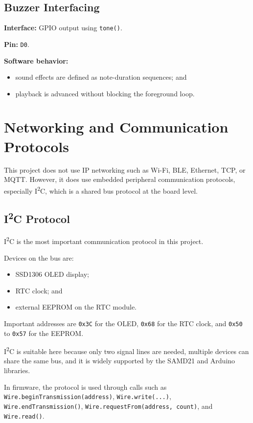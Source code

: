 \documentclass[conference]{IEEEtran}
\begin{document}
\subsection{Buzzer Interfacing}
\textbf{Interface:} GPIO output using \texttt{tone()}.

\textbf{Pin:} \texttt{D0}.

\textbf{Software behavior:}
\begin{itemize}
\item sound effects are defined as note-duration sequences; and
\item playback is advanced without blocking the foreground loop.
\end{itemize}

\section{Networking and Communication Protocols}
This project does not use IP networking such as Wi-Fi, BLE, Ethernet, TCP, or MQTT. However, it does use embedded peripheral communication protocols, especially I\textsuperscript{2}C, which is a shared bus protocol at the board level.

\subsection{I\textsuperscript{2}C Protocol}
I\textsuperscript{2}C is the most important communication protocol in this project.

Devices on the bus are:
\begin{itemize}
\item SSD1306 OLED display;
\item RTC clock; and
\item external EEPROM on the RTC module.
\end{itemize}

Important addresses are \texttt{0x3C} for the OLED, \texttt{0x68} for the RTC clock, and \texttt{0x50} to \texttt{0x57} for the EEPROM.

I\textsuperscript{2}C is suitable here because only two signal lines are needed, multiple devices can share the same bus, and it is widely supported by the SAMD21 and Arduino libraries.

In firmware, the protocol is used through calls such as \texttt{Wire.beginTransmission(address)}, \texttt{Wire.write(...)}, \texttt{Wire.endTransmission()}, \texttt{Wire.requestFrom(address, count)}, and \texttt{Wire.read()}.
\end{document}
